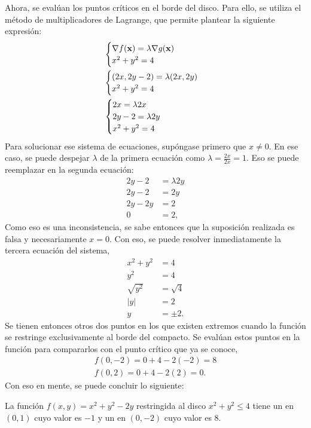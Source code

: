 \documentclass{fmbvecto}
\begin{document}
\begin{problema}[optimización]
    Ahora, se evalúan los puntos críticos en el borde del disco. Para ello, se utiliza el método de multiplicadores de Lagrange, que permite plantear la siguiente expresión:
    \begin{align*}
        &\begin{cases}
            \nabla f(\boldsymbol{{\mathbf{x}}}) = \lambda \nabla g(\boldsymbol{{\mathbf{x}}}) \\
            x^2 + y^2 = 4
        \end{cases} \\
        &\begin{cases}
            (2x, 2y-2) = \lambda (2x, 2y) \\
            x^2 + y^2 = 4
        \end{cases} \\
        &\begin{cases}
            2x = \lambda 2x \\
            2y-2 = \lambda 2y \\
            x^2 + y^2 = 4
        \end{cases}
    \end{align*}
    Para solucionar ese sistema de ecuaciones, supóngase primero que \(x \neq 0\). En ese caso, se puede despejar \(\lambda\) de la primera ecuación como \(\lambda = \frac{2x}{2x} = 1\). Eso se puede reemplazar en la segunda ecuación:
    \begin{align*}
        2y-2 &= \lambda 2y \\
        2y-2 &= 2y \\
        2y-2y &= 2 \\
        0 &= 2,
    \end{align*}
    Como eso es una inconsistencia, se sabe entonces que la suposición realizada es falsa y necesariamente \(x = 0\). Con eso, se puede resolver inmediatamente la tercera ecuación del sistema,
    \begin{align*}
        x^2 + y^2 &= 4 \\
        y^2 &= 4 \\
        \sqrt{y^2} &= \sqrt{4} \\
        |y| &= 2 \\
        y &= \pm 2.
    \end{align*}
    Se tienen entonces otros dos puntos en los que existen extremos cuando la función se restringe exclusivamente al borde del compacto. Se evalúan estos puntos en la función para compararlos con el punto crítico que ya se conoce,
    \begin{align*}
        f(0, -2) = 0+4-2(-2) = 8 \\
        f(0, 2) = 0+4-2(2) = 0.
    \end{align*}
    Con eso en mente, se puede concluir lo siguiente:
    \begin{gbox}
        La función \(f(x,y)=x^2+y^2-2y\) restringida al disco \(x^2+y^2\leq 4\) tiene un  en \((0, 1)\) cuyo valor es \(-1\) y un  en \((0, -2)\) cuyo valor es \(8\).
    \end{gbox}
    
\end{problema}
\end{document}
